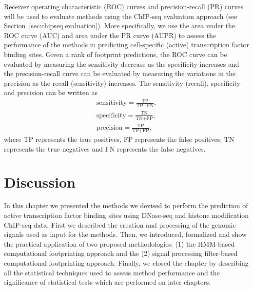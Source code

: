 Receiver operating characteristic (ROC) curves and precision-recall (PR) curves will be used to evaluate methods using the ChIP-seq evaluation approach (see Section~\ref{sec:chipseq.evaluation}). More specifically, we use the area under the ROC curve (AUC) and area under the PR curve (AUPR) to assess the performance of the methods in predicting cell-specific (active) transcription factor binding sites. Given a rank of footprint predictions, the ROC curve can be evaluated by measuring the sensitivity decrease as the specificity increases and the precision-recall curve can be evaluated by measuring the variations in the precision as the recall (sensitivity) increases. The sensitivity (recall), specificity and precision can be written as
\begin{equation}
  \label{eq:baseline.statistics}
  \begin{array}{lcl}
    \text{sensitivity} = \frac{\text{TP}}{\text{TP}+\text{FN}}, \\[1.2em]
    \text{specificity} = \frac{\text{TN}}{\text{TN}+\text{FP}}, \\[1.2em]
    \text{precision} = \frac{\text{TP}}{\text{TP}+\text{FP}},
  \end{array}
\end{equation}
where $ \text{TP} $ represents the true positives, $ \text{FP} $ represents the false positives, $ \text{TN} $ represents the true negatives and $ \text{FN} $ represents the false negatives.

\section{Discussion}
\label{sec:discussion.3}

In this chapter we presented the methods we devised to perform the prediction of active transcription factor binding sites using DNase-seq and histone modification ChIP-seq data. First we described the creation and processing of the genomic signals used as input for the methods. Then, we introduced, formalized and show the practical application of two proposed methodologies: (1) the HMM-based computational footprinting approach and the (2) signal processing filter-based computational footprinting approach. Finally, we closed the chapter by describing all the statistical techniques used to assess method performance and the significance of statistical tests which are performed on later chapters. 


